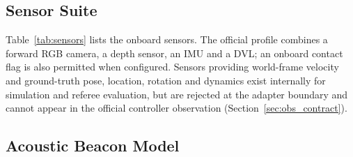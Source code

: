 \subsection{Sensor Suite}

Table~\ref{tab:sensors} lists the onboard sensors. The official profile combines a forward RGB camera, a depth sensor, an IMU and a DVL; an onboard contact flag is also permitted when configured. Sensors providing world-frame velocity and ground-truth pose, location, rotation and dynamics exist internally for simulation and referee evaluation, but are rejected at the adapter boundary and cannot appear in the official controller observation (Section~\ref{sec:obs_contract}).



\subsection{Acoustic Beacon Model}

